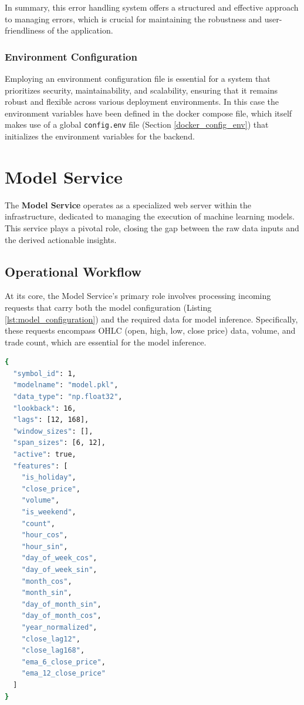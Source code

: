 In summary, this error handling system offers a structured and effective approach to managing errors, which is crucial for maintaining the robustness and user-friendliness of the application.

\subsubsection{Environment Configuration}
Employing an environment configuration file is essential for a system that prioritizes security, maintainability, and scalability, ensuring that it remains robust and flexible across various deployment environments. In this case the environment variables have been defined in the docker compose file, which itself makes use of a global \texttt{config.env} file (Section \ref{docker_config_env}) that initializes the environment variables for the backend.


\section{Model Service}

The \textbf{Model Service} operates as a specialized web server within the infrastructure, dedicated to managing the execution of machine learning models. This service plays a pivotal role, closing the gap between the raw data inputs and the derived actionable insights.

\subsection{Operational Workflow}
At its core, the Model Service's primary role involves processing incoming requests that carry both the model configuration (Listing \ref{lst:model_configuration}) and the required data for model inference. Specifically, these requests encompass OHLC (open, high, low, close price) data, volume, and trade count, which are essential for the model inference.

\begin{lstlisting}[language=bash, caption={Model Configuration (JSON)}, label={lst:model_configuration}]
{
  "symbol_id": 1,
  "modelname": "model.pkl",
  "data_type": "np.float32",
  "lookback": 16,
  "lags": [12, 168],
  "window_sizes": [],
  "span_sizes": [6, 12],
  "active": true,
  "features": [
    "is_holiday",
    "close_price",
    "volume",
    "is_weekend",
    "count",
    "hour_cos",
    "hour_sin",
    "day_of_week_cos",
    "day_of_week_sin",
    "month_cos",
    "month_sin",
    "day_of_month_sin",
    "day_of_month_cos",
    "year_normalized",
    "close_lag12",
    "close_lag168",
    "ema_6_close_price",
    "ema_12_close_price"
  ]
}
\end{lstlisting}

